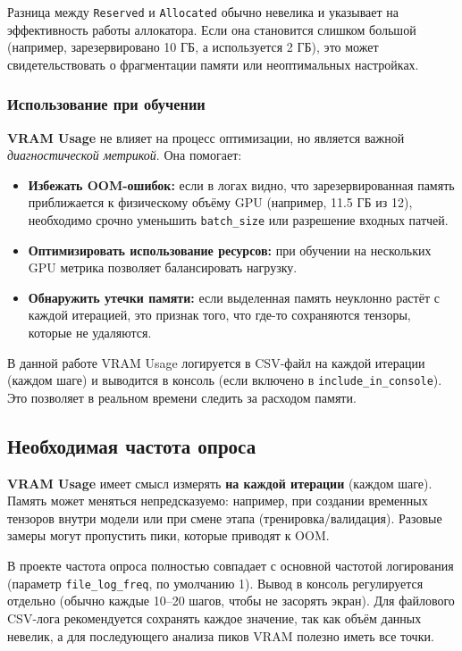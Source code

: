 \documentclass[12pt,a4paper]{article}
\begin{document}
Разница между \texttt{Reserved} и \texttt{Allocated} обычно невелика и указывает на эффективность работы аллокатора. Если она становится слишком большой (например, зарезервировано 10 ГБ, а используется 2 ГБ), это может свидетельствовать о фрагментации памяти или неоптимальных настройках.

\subsubsection{Использование при обучении}

\textbf{VRAM Usage} не влияет на процесс оптимизации, но является важной \textit{диагностической метрикой}. Она помогает:

\begin{itemize}
    \item \textbf{Избежать OOM-ошибок:} если в логах видно, что зарезервированная память приближается к физическому объёму GPU (например, 11.5 ГБ из 12), необходимо срочно уменьшить \texttt{batch\_size} или разрешение входных патчей.
    \item \textbf{Оптимизировать использование ресурсов:} при обучении на нескольких GPU метрика позволяет балансировать нагрузку.
    \item \textbf{Обнаружить утечки памяти:} если выделенная память неуклонно растёт с каждой итерацией, это признак того, что где-то сохраняются тензоры, которые не удаляются.
\end{itemize}

В данной работе VRAM Usage логируется в CSV-файл на каждой итерации (каждом шаге) и выводится в консоль (если включено в \texttt{include\_in\_console}). Это позволяет в реальном времени следить за расходом памяти.

\subsection{Необходимая частота опроса}

\textbf{VRAM Usage} имеет смысл измерять \textbf{на каждой итерации} (каждом шаге). Память может меняться непредсказуемо: например, при создании временных тензоров внутри модели или при смене этапа (тренировка/валидация). Разовые замеры могут пропустить пики, которые приводят к OOM.

В проекте частота опроса полностью совпадает с основной частотой логирования (параметр \texttt{file\_log\_freq}, по умолчанию 1). Вывод в консоль регулируется отдельно (обычно каждые 10--20 шагов, чтобы не засорять экран). Для файлового CSV-лога рекомендуется сохранять каждое значение, так как объём данных невелик, а для последующего анализа пиков VRAM полезно иметь все точки.
\end{document}
